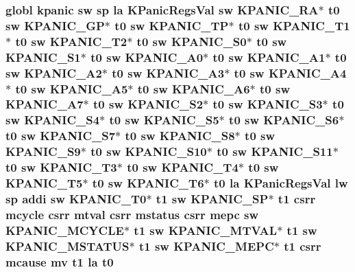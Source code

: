 \hypertarget{riscv_2kpanica_8S_a1df44421822422311baa32ebb99fd40f}{
\subsubsection[{t0}]{\setlength{\rightskip}{0pt plus 5cm}globl {\bf kpanic} {\bf sw} {\bf sp} {\bf la} {\bf K\-Panic\-Regs\-Val} {\bf sw} {\bf K\-P\-A\-N\-I\-C\-\_\-\-R\-A}$\ast$ t0 {\bf sw} {\bf K\-P\-A\-N\-I\-C\-\_\-\-G\-P}$\ast$ t0 {\bf sw} {\bf K\-P\-A\-N\-I\-C\-\_\-\-T\-P}$\ast$ t0 {\bf sw} {\bf K\-P\-A\-N\-I\-C\-\_\-\-T1}$\ast$ t0 {\bf sw} {\bf K\-P\-A\-N\-I\-C\-\_\-\-T2}$\ast$ t0 {\bf sw} {\bf K\-P\-A\-N\-I\-C\-\_\-\-S0}$\ast$ t0 {\bf sw} {\bf K\-P\-A\-N\-I\-C\-\_\-\-S1}$\ast$ t0 {\bf sw} {\bf K\-P\-A\-N\-I\-C\-\_\-\-A0}$\ast$ t0 {\bf sw} {\bf K\-P\-A\-N\-I\-C\-\_\-\-A1}$\ast$ t0 {\bf sw} {\bf K\-P\-A\-N\-I\-C\-\_\-\-A2}$\ast$ t0 {\bf sw} {\bf K\-P\-A\-N\-I\-C\-\_\-\-A3}$\ast$ t0 {\bf sw} {\bf K\-P\-A\-N\-I\-C\-\_\-\-A4}$\ast$ t0 {\bf sw} {\bf K\-P\-A\-N\-I\-C\-\_\-\-A5}$\ast$ t0 {\bf sw} {\bf K\-P\-A\-N\-I\-C\-\_\-\-A6}$\ast$ t0 {\bf sw} {\bf K\-P\-A\-N\-I\-C\-\_\-\-A7}$\ast$ t0 {\bf sw} {\bf K\-P\-A\-N\-I\-C\-\_\-\-S2}$\ast$ t0 {\bf sw} {\bf K\-P\-A\-N\-I\-C\-\_\-\-S3}$\ast$ t0 {\bf sw} {\bf K\-P\-A\-N\-I\-C\-\_\-\-S4}$\ast$ t0 {\bf sw} {\bf K\-P\-A\-N\-I\-C\-\_\-\-S5}$\ast$ t0 {\bf sw} {\bf K\-P\-A\-N\-I\-C\-\_\-\-S6}$\ast$ t0 {\bf sw} {\bf K\-P\-A\-N\-I\-C\-\_\-\-S7}$\ast$ t0 {\bf sw} {\bf K\-P\-A\-N\-I\-C\-\_\-\-S8}$\ast$ t0 {\bf sw} {\bf K\-P\-A\-N\-I\-C\-\_\-\-S9}$\ast$ t0 {\bf sw} {\bf K\-P\-A\-N\-I\-C\-\_\-\-S10}$\ast$ t0 {\bf sw} {\bf K\-P\-A\-N\-I\-C\-\_\-\-S11}$\ast$ t0 {\bf sw} {\bf K\-P\-A\-N\-I\-C\-\_\-\-T3}$\ast$ t0 {\bf sw} {\bf K\-P\-A\-N\-I\-C\-\_\-\-T4}$\ast$ t0 {\bf sw} {\bf K\-P\-A\-N\-I\-C\-\_\-\-T5}$\ast$ t0 {\bf sw} {\bf K\-P\-A\-N\-I\-C\-\_\-\-T6}$\ast$ t0 {\bf la} {\bf K\-Panic\-Regs\-Val} {\bf lw} {\bf sp} addi {\bf sw} {\bf K\-P\-A\-N\-I\-C\-\_\-\-T0}$\ast$ {\bf t1} {\bf sw} {\bf K\-P\-A\-N\-I\-C\-\_\-\-S\-P}$\ast$ {\bf t1} csrr mcycle csrr mtval csrr {\bf mstatus} csrr {\bf mepc} {\bf sw} {\bf K\-P\-A\-N\-I\-C\-\_\-\-M\-C\-Y\-C\-L\-E}$\ast$ {\bf t1} {\bf sw} {\bf K\-P\-A\-N\-I\-C\-\_\-\-M\-T\-V\-A\-L}$\ast$ {\bf t1} {\bf sw} {\bf K\-P\-A\-N\-I\-C\-\_\-\-M\-S\-T\-A\-T\-U\-S}$\ast$ {\bf t1} {\bf sw} {\bf K\-P\-A\-N\-I\-C\-\_\-\-M\-E\-P\-C}$\ast$ {\bf t1} csrr mcause mv {\bf t1} {\bf la} t0}}\label{riscv_2kpanica_8S_a1df44421822422311baa32ebb99fd40f}
